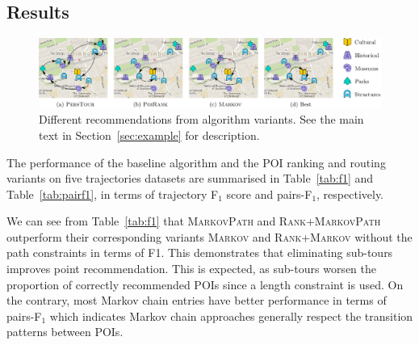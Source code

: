 \subsection{Results}
\label{sec:result}
\secmoveup

%
\begin{figure}[t]
	\centering
	\includegraphics[width=\textwidth]{fig/example-tour.pdf}
	\caption{Different recommendations from algorithm variants.
    See the main text in Section~\ref{sec:example} for description.}
	\label{fig:exampleresult}
	\captionmoveup
\end{figure}



The performance of the baseline algorithm and the POI ranking and routing variants
on five trajectories datasets are summarised in Table~\ref{tab:f1}
and Table~\ref{tab:pairf1}, in terms of trajectory F$_1$ score and pairs-F$_1$, respectively.


We can see from Table~\ref{tab:f1} that \textsc{MarkovPath} and \textsc{Rank+MarkovPath}
outperform their corresponding variants \textsc{Markov} and \textsc{Rank+Markov} without the path constraints in terms of F1.
This demonstrates that eliminating sub-tours improves point recommendation.
This is expected, as sub-tours worsen the proportion of correctly
recommended POIs since a length constraint is used.
On the contrary, most Markov chain entries have better performance in terms of pairs-F$_1$
which indicates Markov chain approaches generally
respect the transition patterns between POIs.
%


